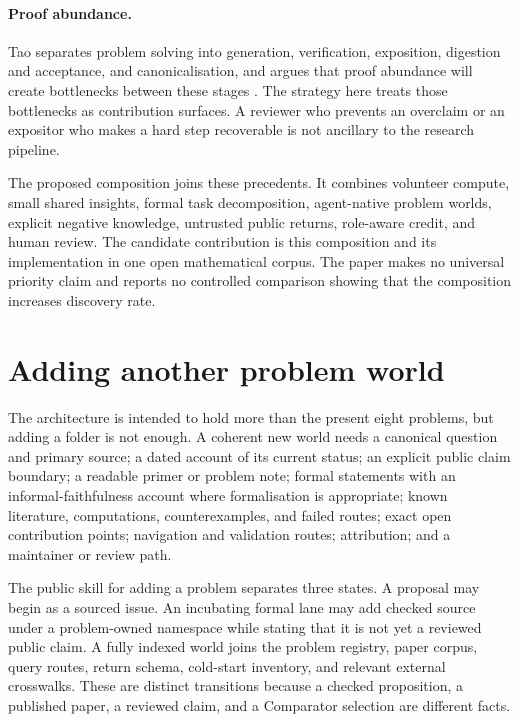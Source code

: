 \documentclass[10pt]{article}
\begin{document}
\paragraph{Proof abundance.}
Tao separates problem solving into generation, verification, exposition,
digestion and acceptance, and canonicalisation, and argues that proof
abundance will create bottlenecks between these stages \cite{tao2026}.  The
strategy here treats those bottlenecks as contribution surfaces.  A reviewer
who prevents an overclaim or an expositor who makes a hard step recoverable is
not ancillary to the research pipeline.

The proposed composition joins these precedents.  It combines volunteer
compute, small shared insights, formal task decomposition, agent-native
problem worlds, explicit negative knowledge, untrusted public returns,
role-aware credit, and human review.  The candidate contribution is this
composition and its implementation in one open mathematical corpus.  The
paper makes no universal priority claim and reports no controlled comparison
showing that the composition increases discovery rate.

\section{Adding another problem world}\label{sec:add-problem}

The architecture is intended to hold more than the present eight problems,
but adding a folder is not enough.  A coherent new world needs a canonical
question and primary source; a dated account of its current status; an explicit
public claim boundary; a readable primer or problem note; formal statements
with an informal-faithfulness account where formalisation is appropriate;
known literature, computations, counterexamples, and failed routes; exact open
contribution points; navigation and validation routes; attribution; and a
maintainer or review path.

The public skill for adding a problem separates three states.  A proposal may
begin as a sourced issue.  An incubating formal lane may add checked source
under a problem-owned namespace while stating that it is not yet a reviewed
public claim.  A fully indexed world joins the problem registry, paper corpus,
query routes, return schema, cold-start inventory, and relevant external
crosswalks.  These are distinct transitions because a checked proposition, a
published paper, a reviewed claim, and a Comparator selection are different
facts.
\end{document}

